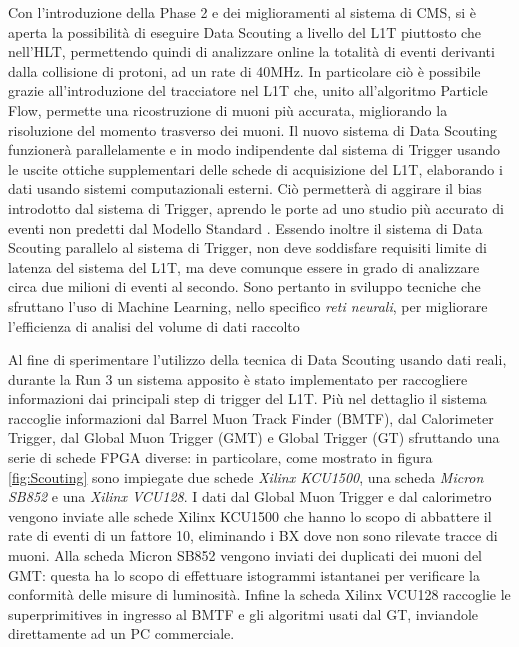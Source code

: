 Con l'introduzione della Phase 2 e dei miglioramenti al sistema di CMS, si è aperta la possibilità di eseguire Data Scouting a livello del L1T piuttosto che nell'HLT, permettendo quindi di analizzare online la totalità di eventi derivanti dalla collisione di protoni, ad un rate di 40MHz. In particolare ciò è possibile grazie all'introduzione del tracciatore nel L1T che, unito all'algoritmo Particle Flow, permette una ricostruzione di muoni più accurata, migliorando la risoluzione del momento trasverso dei muoni. Il nuovo sistema di Data Scouting funzionerà parallelamente e in modo indipendente dal sistema di Trigger usando le uscite ottiche supplementari delle schede di acquisizione del L1T, elaborando i dati usando sistemi computazionali esterni. Ciò permetterà di aggirare il bias introdotto dal sistema di Trigger, aprendo le porte ad uno studio più accurato di eventi non predetti dal Modello Standard \cite{MasterThesisNicLai}. Essendo inoltre il sistema di Data Scouting parallelo al sistema di Trigger, non deve soddisfare requisiti limite di latenza del sistema del L1T, ma deve comunque essere in grado di analizzare circa due milioni di eventi al secondo. Sono pertanto in sviluppo tecniche che sfruttano l'uso di Machine Learning, nello specifico \textit{reti neurali}, per migliorare l'efficienza di analisi del volume di dati raccolto \cite{MasterThesisNicLai}

Al fine di sperimentare l'utilizzo della tecnica di Data Scouting usando dati reali, durante la Run 3 un sistema apposito è stato implementato per raccogliere informazioni dai principali step di trigger del L1T. Più nel dettaglio il sistema raccoglie informazioni dal Barrel Muon Track Finder (BMTF), dal Calorimeter Trigger, dal Global Muon Trigger (GMT) e Global Trigger (GT) sfruttando una serie di schede FPGA diverse: in particolare, come mostrato in figura \ref{fig:Scouting} sono impiegate due schede \textit{Xilinx KCU1500}, una scheda \textit{Micron SB852} e una \textit{Xilinx VCU128}. \newline
I dati dal Global Muon Trigger e dal calorimetro vengono inviate alle schede Xilinx KCU1500 che hanno lo scopo di abbattere il rate di eventi di un fattore 10, eliminando i BX dove non sono rilevate tracce di muoni. Alla scheda Micron SB852 vengono inviati dei duplicati dei muoni del GMT: questa ha lo scopo di effettuare istogrammi istantanei per verificare la conformità delle misure di luminosità. Infine la scheda Xilinx VCU128 raccoglie le superprimitives in ingresso al BMTF e gli algoritmi usati dal GT, inviandole direttamente ad un PC commerciale.
